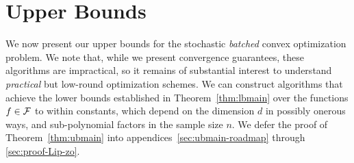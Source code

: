 
\section{Upper Bounds}

We now present our upper bounds for the stochastic \emph{batched} convex
optimization problem. We note that, while we present convergence guarantees,
these algorithms are impractical, so it remains of substantial interest to
understand \emph{practical} but low-round optimization schemes. We can
construct algorithms that achieve the lower bounds established in
Theorem~\ref{thm:lbmain} over the functions $f\in \mathcal{F}$ to within
constants, which depend on the dimension $d$ in possibly onerous ways, and
sub-polynomial factors in the sample size $n$. We defer the proof of
Theorem~\ref{thm:ubmain} into appendices~\ref{sec:ubmain-roadmap} through
\ref{sec:proof-Lip-zo}.
